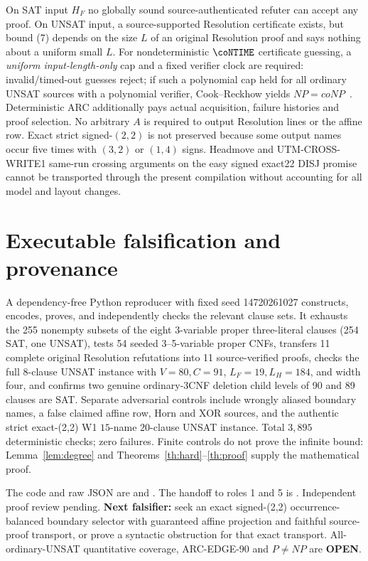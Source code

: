 \documentclass[11pt]{article}
\begin{document}
On SAT input $H_F$ no globally sound source-authenticated refuter can accept any proof. On UNSAT input, a source-supported Resolution certificate exists, but bound (7) depends on the size $L$ of an original Resolution proof and says nothing about a uniform small $L$. For nondeterministic $\coNTIME$ certificate guessing, a \emph{uniform input-length-only} cap and a fixed verifier clock are required: invalid/timed-out guesses reject; if such a polynomial cap held for all ordinary UNSAT sources with a polynomial verifier, Cook--Reckhow yields $NP=coNP$~\cite{CR}. Deterministic ARC additionally pays actual acquisition, failure histories and proof selection. No arbitrary $A$ is required to output Resolution lines or the affine row. Exact strict signed-$(2,2)$ is not preserved because some output names occur five times with $(3,2)$ or $(1,4)$ signs. Headmove and UTM-CROSS-WRITE1 same-run crossing arguments on the easy signed exact22 DISJ promise cannot be transported through the present compilation without accounting for all model and layout changes.

\section{Executable falsification and provenance}
A dependency-free Python reproducer with fixed seed 14720261027 constructs, encodes, proves, and independently checks the relevant clause sets. It exhausts the 255 nonempty subsets of the eight 3-variable proper three-literal clauses (254 SAT, one UNSAT), tests 54 seeded 3--5-variable proper CNFs, transfers 11 complete original Resolution refutations into 11 source-verified proofs, checks the full 8-clause UNSAT instance with $V=80,C=91$, $L_F=19,L_H=184$, and width four, and confirms two genuine ordinary-3CNF deletion child levels of 90 and 89 clauses are SAT. Separate adversarial controls include wrongly aliased boundary names, a false claimed affine row, Horn and XOR sources, and the authentic strict exact-(2,2) W1 $15$-name $20$-clause UNSAT instance. Total $3,895$ deterministic checks; zero failures. Finite controls do not prove the infinite bound: Lemma~\ref{lem:degree} and Theorems~\ref{th:hard}--\ref{th:proof} supply the mathematical proof.

The code and raw JSON are  and . The handoff to roles 1 and 5 is . Independent proof review pending. \textbf{Next falsifier:} seek an exact signed-(2,2) occurrence-balanced boundary selector with guaranteed affine projection and faithful source-proof transport, or prove a syntactic obstruction for that exact transport. All-ordinary-UNSAT quantitative coverage, ARC-EDGE-90 and $P\ne NP$ are \textbf{OPEN}.
\end{document}
